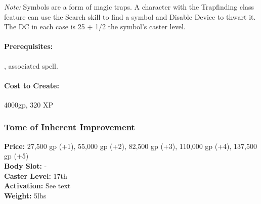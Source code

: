 \begin{table*}
\caption{Symbols}
\label{tab:Symbols}
\centering
{}
\end{table*}
\emph{Note:} Symbols are a form of magic traps. 
A character with the Trapfinding class feature can use the Search skill to find a symbol and Disable Device to thwart it. 
The DC in each case is 25 + 1/2 the symbol's caster level. 

\paragraph{Prerequisites:} , associated spell.

\paragraph{Cost to Create:} 4000gp, 320 XP

\subsubsection{Tome of Inherent Improvement}
\textbf{Price:} 27,500 gp (+1), 55,000 gp (+2), 82,500 gp (+3), 110,000 gp (+4), 137,500 gp (+5)\\
\textbf{Body Slot:} -\\
\textbf{Caster Level:} 17th\\
\textbf{Activation:} See text\\
\textbf{Weight:} 5lbs

